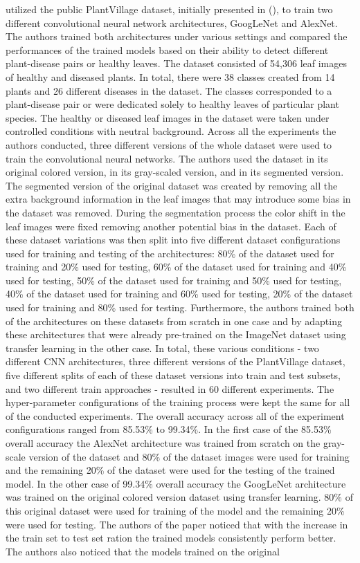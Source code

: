 \documentclass{BachelorBUI}
\begin{document}
\textcite{Mohanty:2016} utilized the public PlantVillage dataset, initially presented in (\cite{Hughes:2015}), to train two different convolutional neural network architectures, GoogLeNet and AlexNet. The authors trained both architectures under various settings and compared the performances of the trained models based on their ability to detect different plant-disease pairs or healthy leaves. The dataset consisted of 54,306 leaf images of healthy and diseased plants. In total, there were 38 classes created from 14 plants and 26 different diseases in the dataset. The classes corresponded to a plant-disease pair or were dedicated solely to healthy leaves of particular plant species. The healthy or diseased leaf images in the dataset were taken under controlled conditions with neutral background. Across all the experiments the authors conducted, three different versions of the whole dataset were used to train the convolutional neural networks. The authors used the dataset in its original colored version, in its gray-scaled version, and in its segmented version. The segmented version of the original dataset was created by removing all the extra background information in the leaf images that may introduce some bias in the dataset was removed. During the segmentation process the color shift in the leaf images were fixed removing another potential bias in the dataset. Each of these dataset variations was then split into five different dataset configurations used for training and testing of the architectures: 80\% of the dataset used for training and 20\% used for testing, 60\% of the dataset used for training and 40\% used for testing, 50\% of the dataset used for training and 50\% used for testing, 40\% of the dataset used for training and 60\% used for testing, 20\% of the dataset used for training and 80\% used for testing. Furthermore, the authors trained both of the architectures on these datasets from scratch in one case and by adapting these architectures that were already pre-trained on the ImageNet dataset using transfer learning in the other case. In total, these various conditions - two different CNN architectures, three different versions of the PlantVillage dataset, five different splits of each of these dataset versions into train and test subsets, and two different train approaches - resulted in 60 different experiments. The hyper-parameter configurations of the training process were kept the same for all of the conducted experiments. The overall accuracy across all of the experiment configurations ranged from 85.53\% to 99.34\%. In the first case of the 85.53\% overall accuracy the AlexNet architecture was trained from scratch on the gray-scale version of the dataset and 80\% of the dataset images were used for training and the remaining 20\% of the dataset were used for the testing of the trained model. In the other case of 99.34\% overall accuracy the GoogLeNet architecture was trained on the original colored version dataset using transfer learning. 80\% of this original dataset were used for training of the model and the remaining 20\% were used for testing. The authors of the paper noticed that with the increase in the train set to test set ration the trained models consistently perform better. The authors also noticed that the models trained on the original 
\end{document}
